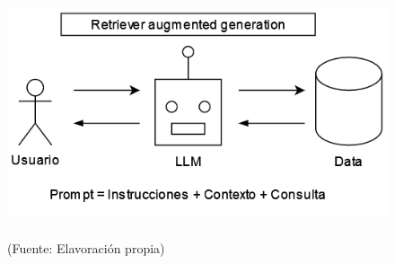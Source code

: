 \begin{figure}[ht!]
    \centering
    \includegraphics[width=.4\textwidth]{figures/huemul5.png}
    \caption[]{\\
    {\scriptsize (Fuente: Elavoración propia)}}
    \label{fig:chatbot1}
\end{figure}
